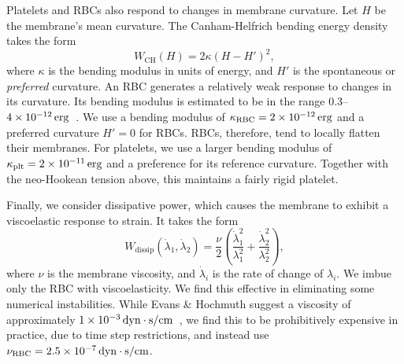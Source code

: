 Platelets and RBCs also respond to changes in membrane curvature. Let $H$ be the membrane's mean curvature. The
Canham-Helfrich bending energy density takes the form~\cite{Canham:1970wx}
\begin{equation}\label{eq:bending-energy}
    W_\text{CH}(H) = 2\kappa {(H-H')}^2,
\end{equation}
where $\kappa$ is the bending modulus in units of energy, and $H'$ is the spontaneous or \emph{preferred}
curvature. An RBC generates a relatively weak response to changes in its curvature. Its bending modulus is
estimated to be in the range $0.3$--$4\sci{-12}\erg$~\cite{Mohandas:1994tg}. We use a bending modulus of
$\rbc\kappa = 2\sci{-12}\erg$ and a preferred curvature $H' = 0$ for RBCs. RBCs, therefore, tend to locally
flatten their membranes. For platelets, we use a larger bending modulus of $\plt\kappa=2\sci{-11}\erg$
and a preference for its reference curvature. Together with the neo-Hookean tension above, this maintains a fairly
rigid platelet.

Finally, we consider dissipative power, which causes the membrane to exhibit a viscoelastic response to strain. It
takes the form~\cite{Rangamani:2012hi}
\begin{equation}\label{eq:dissip-energy}
    W_\text{dissip}(\dot{\lambda}_1, \dot{\lambda}_2) = \frac{\nu}{2}\left(\frac{\dot{\lambda}_1^2}{\lambda_1^2} + \frac{\dot{\lambda}_2^2}{\lambda_2^2}\right),
\end{equation}
where $\nu$ is the membrane viscosity, and $\dot{\lambda}_i$ is the rate of change of $\lambda_i$. We imbue only
the RBC with viscoelasticity. We find this effective in eliminating some numerical instabilities. While Evans \&
Hochmuth suggest a viscosity of approximately $1\sci{-3}\dynsecpercm$~\cite{Evans:1976tx}, we find this to be
prohibitively expensive in practice, due to time step restrictions, and instead use
$\rbc\nu = 2.5\sci{-7}\dynsecpercm$.
